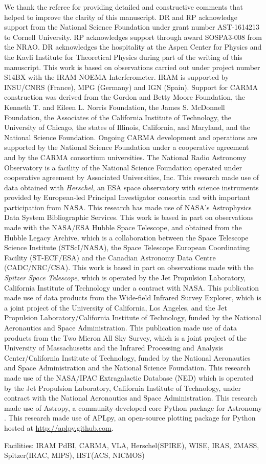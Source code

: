 \documentclass[]{emulateapj}
\def\spitzer {{\it Spitzer Space Telescope}\xspace}
\begin{document}
\begin{acknowledgments}
We thank the referee for providing detailed and constructive comments that helped to improve the clarity of this manuscript.
DR and RP acknowledge support from the National Science Foundation
under grant number AST-1614213 to Cornell University. RP acknowledges
support through award SOSPA3-008 from the NRAO. DR acknowledges the
hospitality at the Aspen Center for Physics and the Kavli Institute
for Theoretical Physics during part of the writing of this manuscript.
This work is based on observations carried out under project number S14BX
with the IRAM NOEMA Interferometer. IRAM is supported by INSU/CNRS (France), MPG (Germany) and IGN (Spain).
Support for CARMA construction was derived from the Gordon and Betty Moore
Foundation, the Kenneth T. and Eileen L. Norris Foundation, the James S.
McDonnell Foundation, the Associates of the California Institute of
Technology, the University of Chicago, the states of Illinois, California, and
Maryland, and the National Science Foundation. Ongoing CARMA development and
operations are supported by the National Science Foundation under a
cooperative agreement and by the CARMA consortium universities.
The National Radio Astronomy Observatory is a facility of the National Science
Foundation operated under cooperative agreement by Associated
Universities, Inc.
This research made use of data obtained with {\it Herschel}, an ESA space
observatory with science instruments provided by European-led Principal
Investigator consortia and with important participation from NASA.
This research has made use of NASA's Astrophysics Data System Bibliographic
Services.
This work is based in part on observations
made with the NASA/ESA Hubble Space Telescope, and obtained from the Hubble
Legacy Archive, which is a collaboration between the Space Telescope Science
Institute (STScI/NASA), the Space Telescope European Coordinating Facility
(ST-ECF/ESA) and the Canadian Astronomy Data Centre (CADC/NRC/CSA).
This work is based
in part on observations made with the \spitzer,
which is operated by the Jet Propulsion Laboratory, California Institute of
Technology under a contract with NASA.
This publication made use of data products from the Wide-field Infrared
Survey Explorer, which is a joint project of the University of California, Los
Angeles, and the Jet Propulsion Laboratory/California Institute of Technology,
funded by the National Aeronautics and Space Administration.
This publication made use of data products from the Two Micron All Sky
Survey, which is a joint project of the University of Massachusetts and the
Infrared Processing and Analysis Center/California Institute of Technology,
funded by the National Aeronautics and Space Administration and the National
Science Foundation.
This research made use of the NASA/IPAC Extragalactic Database (NED) which
is operated by the Jet Propulsion Laboratory, California Institute of
Technology, under contract with the National Aeronautics and Space
Administration.
This research made use of Astropy, a community-developed core Python package for Astronomy \citep{astropy}.
This research made use of APLpy, an open-source plotting package for Python hosted at \url{http://aplpy.github.com}.

Facilities: IRAM PdBI, CARMA, VLA, Herschel(SPIRE), WISE, IRAS, 2MASS, Spitzer(IRAC, MIPS), HST(ACS, NICMOS)
\end{acknowledgments}



\end{document}
